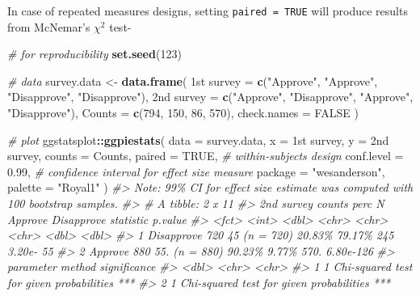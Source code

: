 \documentclass[
]{article}
\newenvironment{Shaded}{\begin{snugshade}}{\end{snugshade}}
\newcommand{\CommentTok}[1]{\textcolor[rgb]{0.56,0.35,0.01}{\textit{#1}}}
\newcommand{\DataTypeTok}[1]{\textcolor[rgb]{0.13,0.29,0.53}{#1}}
\newcommand{\DecValTok}[1]{\textcolor[rgb]{0.00,0.00,0.81}{#1}}
\newcommand{\FloatTok}[1]{\textcolor[rgb]{0.00,0.00,0.81}{#1}}
\newcommand{\KeywordTok}[1]{\textcolor[rgb]{0.13,0.29,0.53}{\textbf{#1}}}
\newcommand{\NormalTok}[1]{#1}
\newcommand{\OperatorTok}[1]{\textcolor[rgb]{0.81,0.36,0.00}{\textbf{#1}}}
\newcommand{\OtherTok}[1]{\textcolor[rgb]{0.56,0.35,0.01}{#1}}
\newcommand{\StringTok}[1]{\textcolor[rgb]{0.31,0.60,0.02}{#1}}
\begin{document}
In case of repeated measures designs, setting \texttt{paired\ =\ TRUE} will produce
results from McNemar's \(\chi^2\) test-

\begin{Shaded}
\begin{Highlighting}[]
\CommentTok{\# for reproducibility}
\KeywordTok{set.seed}\NormalTok{(}\DecValTok{123}\NormalTok{)}

\CommentTok{\# data}
\NormalTok{survey.data <{-}}\StringTok{ }\KeywordTok{data.frame}\NormalTok{(}
  \StringTok{\textasciigrave{}}\DataTypeTok{1st survey}\StringTok{\textasciigrave{}}\NormalTok{ =}\StringTok{ }\KeywordTok{c}\NormalTok{(}\StringTok{"Approve"}\NormalTok{, }\StringTok{"Approve"}\NormalTok{, }\StringTok{"Disapprove"}\NormalTok{, }\StringTok{"Disapprove"}\NormalTok{),}
  \StringTok{\textasciigrave{}}\DataTypeTok{2nd survey}\StringTok{\textasciigrave{}}\NormalTok{ =}\StringTok{ }\KeywordTok{c}\NormalTok{(}\StringTok{"Approve"}\NormalTok{, }\StringTok{"Disapprove"}\NormalTok{, }\StringTok{"Approve"}\NormalTok{, }\StringTok{"Disapprove"}\NormalTok{),}
  \StringTok{\textasciigrave{}}\DataTypeTok{Counts}\StringTok{\textasciigrave{}}\NormalTok{ =}\StringTok{ }\KeywordTok{c}\NormalTok{(}\DecValTok{794}\NormalTok{, }\DecValTok{150}\NormalTok{, }\DecValTok{86}\NormalTok{, }\DecValTok{570}\NormalTok{),}
  \DataTypeTok{check.names =} \OtherTok{FALSE}
\NormalTok{)}

\CommentTok{\# plot}
\NormalTok{ggstatsplot}\OperatorTok{::}\KeywordTok{ggpiestats}\NormalTok{(}
  \DataTypeTok{data =}\NormalTok{ survey.data,}
  \DataTypeTok{x =} \StringTok{\textasciigrave{}}\DataTypeTok{1st survey}\StringTok{\textasciigrave{}}\NormalTok{,}
  \DataTypeTok{y =} \StringTok{\textasciigrave{}}\DataTypeTok{2nd survey}\StringTok{\textasciigrave{}}\NormalTok{,}
  \DataTypeTok{counts =}\NormalTok{ Counts,}
  \DataTypeTok{paired =} \OtherTok{TRUE}\NormalTok{, }\CommentTok{\# within{-}subjects design}
  \DataTypeTok{conf.level =} \FloatTok{0.99}\NormalTok{, }\CommentTok{\# confidence interval for effect size measure}
  \DataTypeTok{package =} \StringTok{"wesanderson"}\NormalTok{,}
  \DataTypeTok{palette =} \StringTok{"Royal1"}
\NormalTok{)}
\CommentTok{\#> Note: 99\% CI for effect size estimate was computed with 100 bootstrap samples.}
\CommentTok{\#> \# A tibble: 2 x 11}
\CommentTok{\#>   \textasciigrave{}2nd survey\textasciigrave{} counts  perc N         Approve Disapprove statistic   p.value}
\CommentTok{\#>   <fct>         <int> <dbl> <chr>     <chr>   <chr>          <dbl>     <dbl>}
\CommentTok{\#> 1 Disapprove      720   45  (n = 720) 20.83\%  79.17\%          245  3.20e{-} 55}
\CommentTok{\#> 2 Approve         880   55. (n = 880) 90.23\%  9.77\%           570. 6.80e{-}126}
\CommentTok{\#>   parameter method                                   significance}
\CommentTok{\#>       <dbl> <chr>                                    <chr>       }
\CommentTok{\#> 1         1 Chi{-}squared test for given probabilities ***         }
\CommentTok{\#> 2         1 Chi{-}squared test for given probabilities ***}
\end{Highlighting}
\end{Shaded}
\end{document}
